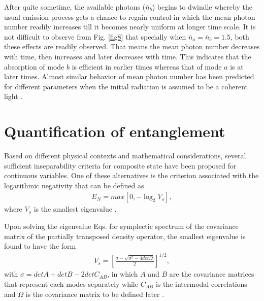 \documentclass[twocolumn,showpacs,preprintnumbers,amsmath,amssymb,pra]{revtex4}
\begin{document}
After quite sometime, the available photons ($\bar{n}_{b}$) begins to dwindle whereby the usual emission process gets a chance to regain control in which the mean photon number readily increases till it becomes nearly uniform at longer time scale. It is not difficult to observe from Fig. \ref{fig8} that specially when $\bar{n}_{a}=\bar{n}_{b}=1.5$, both these effects are readily observed. That means the mean photon number decreases with time, then increases and later decreases with time. This indicates that the absorption of mode $b$ is efficient in earlier times whereas that of mode $a$ is at later times. Almost similar behavior of mean photon number has been predicted for different parameters when the initial radiation is assumed to be a coherent light \cite{oc283781}.

\section{Quantification of entanglement}

Based on different physical contexts and mathematical considerations, several sufficient inseparability criteria for composite state have been proposed \cite{prl93063601,prl842722,prl95120502,pla2231,prl771413,prl842726,prl88120401,pra67052104,pra67022320,prl96050503,prl95230502} for continuous variables. One of these alternatives is the criterion associated with the logarithmic negativity \cite{pra70022318,pra65032314,job7577} that can be defined as
\begin{align}\label{s59}E_{N}=max[0,-\log_{2}V_{s}],\end{align} where $V_{s}$ is the smallest eigenvalue \cite{prl93063601,pra70022318}. 

Upon solving the eigenvalue Eqs. for symplectic spectrum of the covariance matrix of the partially transposed density operator, the smallest eigenvalue is found to have the form
\begin{align}\label{s60}V_{s}=\left[\frac{\sigma-\sqrt{\sigma^{2}-4det\Omega}}{2}\right]^{1/2},\end{align} with
$\sigma= det A+det B-2det C_{AB}$,
in which $A$ and $B$ are the covariance matrices that represent each modes separately while $C_{AB}$ is the intermodal correlations and $\Omega$ is the covariance matrix to be defined later \cite{prl93063601,pra65032314}. 
\end{document}
